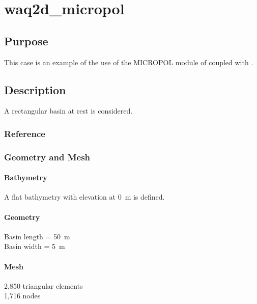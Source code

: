 \chapter{waq2d\_micropol}
%
%
\section{Purpose}
%
This case is an example of the use of the MICROPOL module of \waqtel coupled with .
%
\section{Description}
%
A rectangular basin at rest is considered.
%
%
%
%
\subsection{Reference}
%

%
%
%
\subsection{Geometry and Mesh}
%
\subsubsection{Bathymetry}
%
A flat bathymetry with elevation at 0~m is defined.
%
\subsubsection{Geometry}
%
Basin length = 50~m\\
Basin width = 5~m
%
\subsubsection{Mesh}
%
2,850 triangular elements\\
1,716 nodes
%
%
%
